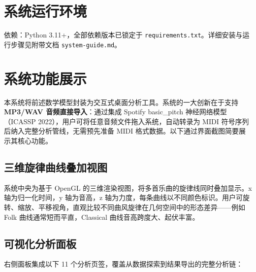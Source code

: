 \documentclass[withoutpreface]{cumcmthesis}
\begin{document}
\begin{appendices}
\section{系统运行环境}

依赖：Python 3.11+，全部依赖版本已锁定于 \texttt{requirements.txt}。详细安装与运行步骤见附带文档 \texttt{system-guide.md}。

\section{系统功能展示}

本系统将前述数学模型封装为交互式桌面分析工具。系统的一大创新在于支持 \textbf{MP3/WAV 音频直接导入}：通过集成 Spotify basic\_pitch 神经网络模型（ICASSP 2022），用户可将任意音频文件拖入系统，自动转录为 MIDI 符号序列后纳入完整分析管线，无需预先准备 MIDI 格式数据。以下通过界面截图简要展示其核心功能。

\subsection{三维旋律曲线叠加视图}

系统中央为基于 OpenGL 的三维渲染视图，将多首乐曲的旋律线同时叠加显示。x 轴为归一化时间，y 轴为音高，z 轴为力度，每条曲线以不同颜色标识。用户可旋转、缩放、平移视角，直观比较不同曲风旋律在几何空间中的形态差异——例如 Folk 曲线通常短而平直，Classical 曲线音高跨度大、起伏丰富。

\subsection{可视化分析面板}

右侧面板集成以下 11 个分析页签，覆盖从数据探索到结果导出的完整分析链：


\end{appendices}
\end{document}
